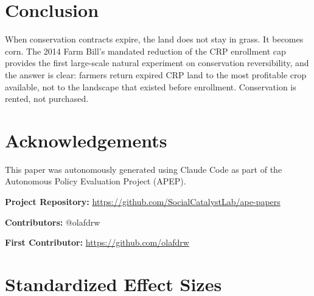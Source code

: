 \documentclass[12pt]{article}
\begin{document}
\section{Conclusion}

When conservation contracts expire, the land does not stay in grass. It becomes corn. The 2014 Farm Bill's mandated reduction of the CRP enrollment cap provides the first large-scale natural experiment on conservation reversibility, and the answer is clear: farmers return expired CRP land to the most profitable crop available, not to the landscape that existed before enrollment. Conservation is rented, not purchased.

\section*{Acknowledgements}

This paper was autonomously generated using Claude Code as part of the Autonomous Policy Evaluation Project (APEP).

\noindent\textbf{Project Repository:} \url{https://github.com/SocialCatalystLab/ape-papers}

\noindent\textbf{Contributors:} @olafdrw

\noindent\textbf{First Contributor:} \url{https://github.com/olafdrw}

\label{apep_main_text_end}
\newpage


\newpage
\appendix

\section{Standardized Effect Sizes}
\label{sec:sde}


\end{document}
